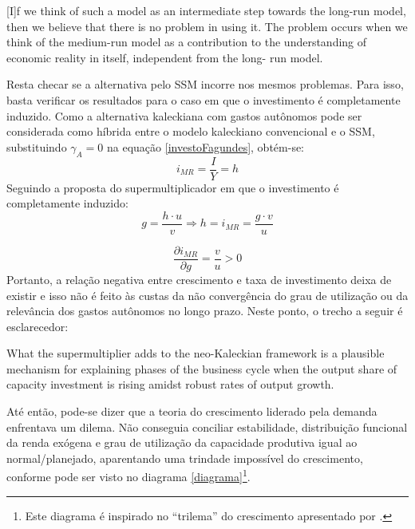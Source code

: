 \begin{citacao}
	
	[I]f we think of such a model as an intermediate step towards the long-run model, then we
	believe that there is no problem in using it. The problem occurs when we think of the medium-run
	model as a contribution to the understanding of economic reality in itself, independent from the long-
	run model.
\end{citacao}

Resta checar se a alternativa pelo SSM incorre nos mesmos problemas. Para isso, basta verificar os resultados para o caso em que o investimento é completamente induzido. Como a alternativa kaleckiana com gastos autônomos pode ser considerada como híbrida entre o modelo kaleckiano convencional e o SSM, substituindo $\gamma_A = 0$ na equação \ref{investoFagundes}, obtém-se:
$$
i_{MR} = \frac{I}{Y} =  h
$$
Seguindo a proposta do supermultiplicador em que o investimento é completamente induzido:
$$
g = \frac{h\cdot u}{v} \Rightarrow h = i_{MR} = \frac{g\cdot v}{u}
$$

$$
\frac{\partial i_{MR}}{\partial g} = \frac{v}{u} > 0
$$
Portanto, a relação negativa entre crescimento e taxa de investimento deixa de existir e isso não é feito às custas da não convergência do grau de utilização ou da relevância dos gastos autônomos no longo prazo. Neste ponto, o trecho a seguir é esclarecedor:

\begin{citacao}
	What the supermultiplier adds to the neo-Kaleckian framework is a plausible mechanism for explaining phases
	of the business cycle when the output share of capacity investment is rising amidst robust rates of output growth. \cite[p.~9]{fiebiger_trend_2017}
\end{citacao}
Até então, pode-se dizer que a teoria do crescimento liderado pela demanda enfrentava um dilema. Não conseguia conciliar estabilidade, distribuição funcional da renda exógena e grau de utilização da capacidade produtiva igual ao normal/planejado, aparentando uma trindade impossível do crescimento, conforme pode ser visto no diagrama \ref{diagrama}\footnote{Este diagrama é inspirado no ``trilema'' do crescimento apresentado por \textcite{cesaratto_neo-kaleckian_2015}.}.


